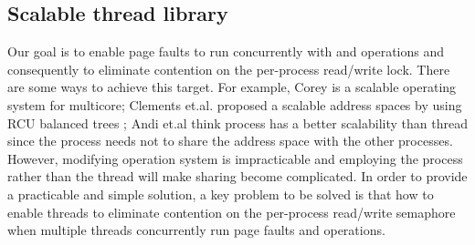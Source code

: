 \subsection{Scalable thread library}
Our goal is to enable page faults to run concurrently with  and  operations and consequently to eliminate contention on the per-process read/write lock.
There are some ways to achieve this target. 
For example, Corey\cite{boyd2008corey} is a scalable operating system for multicore;
Clements et.al. proposed a scalable address spaces by using RCU balanced trees \cite{clements2012concurrent};
Andi et.al think process has a better scalability than thread since the process needs not to share the address space with the other processes\cite{Andi2009lmulticore}.
However, modifying operation system is impracticable and employing the process rather than the thread will make sharing become complicated. 
In order to provide a practicable and simple solution, a key problem to be solved is that how to enable threads to eliminate contention on the per-process read/write semaphore when multiple threads concurrently run page faults and  operations.





